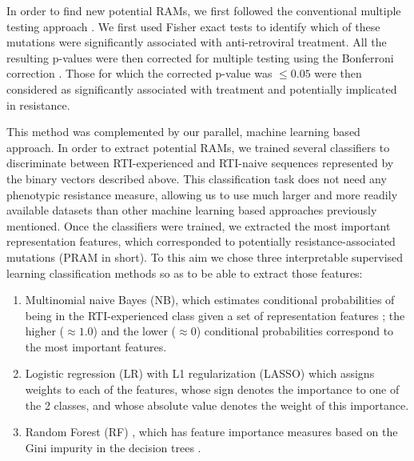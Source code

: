 \documentclass[
  11pt,
  twoside,
  BCOR=10mm,
  listof=totoc]{scrbook}
\begin{document}
In order to find new potential RAMs, we first followed the conventional
multiple testing approach \autocite{villabona-arenasIndepthAnalysisHIV12016}. We
first used Fisher exact tests to identify which of these mutations were
significantly associated with anti-retroviral treatment. All the
resulting p-values were then corrected for multiple testing using the
Bonferroni correction \autocite{goemanMultipleHypothesisTesting2014}. Those for
which the corrected p-value was \(≤ 0.05\) were then considered as
significantly associated with treatment and potentially implicated in
resistance.

This method was complemented by our parallel, machine learning based
approach. In order to extract potential RAMs, we trained several
classifiers to discriminate between RTI-experienced and RTI-naive
sequences represented by the binary vectors described above. This
classification task does not need any phenotypic resistance measure,
allowing us to use much larger and more readily available datasets than
other machine learning based approaches previously mentioned. Once the
classifiers were trained, we extracted the most important representation
features, which corresponded to potentially resistance-associated
mutations (PRAM in short). To this aim we chose three interpretable
supervised learning classification methods so as to be able to extract
those features:

\begin{enumerate}
\def\labelenumi{\arabic{enumi}.}
\item
  Multinomial naive Bayes (NB), which estimates conditional
  probabilities of being in the RTI-experienced class given a set of
  representation features \autocite{rennie2003tackling}; the higher
  (\(\approx 1.0\)) and the lower (\(\approx0\)) conditional probabilities
  correspond to the most important features.
\item
  Logistic regression (LR) with L1 regularization (LASSO)
  \autocite{tibshiraniRegressionShrinkageSelection1996} which assigns weights
  to each of the features, whose sign denotes the importance to one of
  the 2 classes, and whose absolute value denotes the weight of this
  importance.
\item
  Random Forest (RF) , which has feature importance measures based on
  the Gini impurity in the decision trees \autocite{breimanRandomForests2001}.
\end{enumerate}
\end{document}
